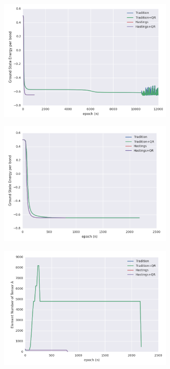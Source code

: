 \begin{figure}[ht]
	\centering
	\includegraphics[width=0.75\textwidth]{figures/fig325.png}
	\caption[Per epoch energy of Heisenberg model on 2d square lattice with fixed truncation error]{}
	\label{fig325}
\end{figure}

\begin{figure}[ht]
	\centering
	\includegraphics[width=0.75\textwidth]{figures/fig326.png}
	\caption[CPU times of different 2D-iTEBD with dynamic trucation error]{}
	\label{fig326}
\end{figure}

\begin{figure}[ht]
	\centering
	\includegraphics[width=0.75\textwidth]{figures/fig327.png}
	\caption[Per epoch energy of Heisenberg model on 2d square lattice with dynamic truncation error]{}
	\label{fig327}
\end{figure}
